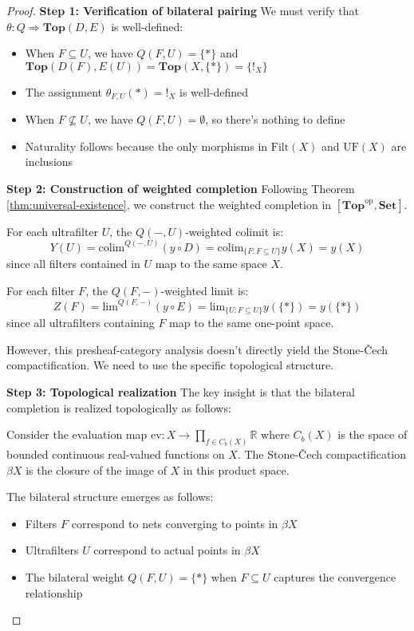 \documentclass[11pt]{article}
\theoremstyle{plain}
\theoremstyle{definition}
\theoremstyle{remark}
\newcommand{\op}{\mathrm{op}}
\newcommand{\colim}{\mathrm{colim}}
\renewcommand{\lim}{\mathrm{lim}}
\begin{document}
\begin{proof}
\textbf{Step 1: Verification of bilateral pairing}
We must verify that $\theta : Q \Rightarrow \mathbf{Top}(D, E)$ is well-defined:
\begin{itemize}
\item When $F \subseteq U$, we have $Q(F, U) = \{*\}$ and $\mathbf{Top}(D(F), E(U)) = \mathbf{Top}(X, \{*\}) = \{!_X\}$
\item The assignment $\theta_{F,U}(*) = !_X$ is well-defined
\item When $F \not\subseteq U$, we have $Q(F, U) = \emptyset$, so there's nothing to define
\item Naturality follows because the only morphisms in $\mathrm{Filt}(X)$ and $\mathrm{UF}(X)$ are inclusions
\end{itemize}

\textbf{Step 2: Construction of weighted completion}
Following Theorem \ref{thm:universal-existence}, we construct the weighted completion in $[\mathbf{Top}^{\op}, \mathbf{Set}]$.

For each ultrafilter $U$, the $Q(-, U)$-weighted colimit is:
$$Y(U) = \colim^{Q(-, U)} (y \circ D) = \colim_{\{F : F \subseteq U\}} y(X) = y(X)$$
since all filters contained in $U$ map to the same space $X$.

For each filter $F$, the $Q(F, -)$-weighted limit is:
$$Z(F) = \lim^{Q(F, -)} (y \circ E) = \lim_{\{U : F \subseteq U\}} y(\{*\}) = y(\{*\})$$
since all ultrafilters containing $F$ map to the same one-point space.

However, this presheaf-category analysis doesn't directly yield the Stone-\v{C}ech compactification. We need to use the specific topological structure.

\textbf{Step 3: Topological realization}
The key insight is that the bilateral completion is realized topologically as follows:

Consider the evaluation map $\text{ev} : X \to \prod_{f \in C_b(X)} \mathbb{R}$ where $C_b(X)$ is the space of bounded continuous real-valued functions on $X$. The Stone-\v{C}ech compactification $\beta X$ is the closure of the image of $X$ in this product space.

The bilateral structure emerges as follows:
\begin{itemize}
\item Filters $F$ correspond to nets converging to points in $\beta X$
\item Ultrafilters $U$ correspond to actual points in $\beta X$ 
\item The bilateral weight $Q(F, U) = \{*\}$ when $F \subseteq U$ captures the convergence relationship
\end{itemize}


\end{proof}
\end{document}
